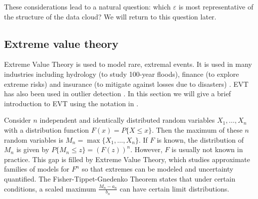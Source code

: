\documentclass[11pt,a4paper,]{article}
\theoremstyle{definition}
\theoremstyle{definition}
\theoremstyle{definition}
\theoremstyle{remark}
\begin{document}
These considerations lead to a natural question: which \(\varepsilon\) is most representative of the structure of the data cloud? We will return to this question later.

\hypertarget{subsec:evt}{%
\subsection{Extreme value theory}\label{subsec:evt}}

Extreme Value Theory is used to model rare, extremal events. It is used in many industries including hydrology (to study 100-year floods), finance (to explore extreme risks) and insurance (to mitigate against losses due to disasters) \autocite{Reiss2001}. EVT has also been used in outlier detection \autocite{wilkinson2017visualizing,talagala2019anomaly}. In this section we will give a brief introduction to EVT using the notation in \textcite{coles2001introduction}.

Consider \(n\) independent and identically distributed random variables \(X_1, \dots, X_n\) with a distribution function \(F(x) = P\{X \leq x\}\). Then the maximum of these \(n\) random variables is \(M_n = \max \{X_1, \dots, X_n\}\). If \(F\) is known, the distribution of \(M_n\) is given by \autocite[p45]{coles2001introduction} \(P\{M_n \leq z \} = \left(F(z)\right)^n\). However, \(F\) is usually not known in practice. This gap is filled by Extreme Value Theory, which studies approximate families of models for \(F^n\) so that extremes can be modeled and uncertainty quantified. The Fisher-Tippet-Gnedenko Theorem states that under certain conditions, a scaled maximum \(\frac{M_n - a_n}{b_n}\) can have certain limit distributions.
\end{document}
